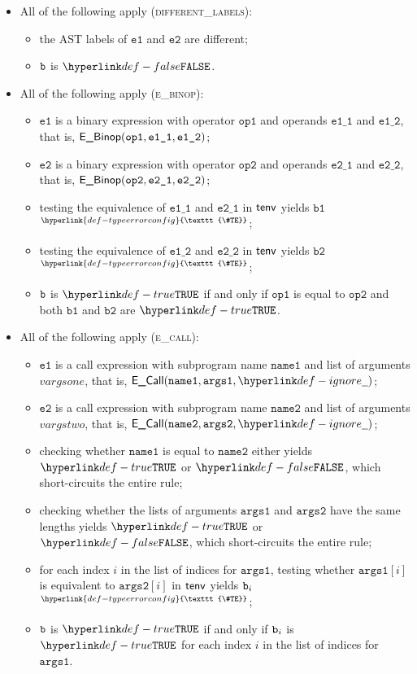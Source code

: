 \documentclass{book}
\newcommand\TypeErrorConfig[0]{\hyperlink{def-typeerrorconfig}{\texttt{\#TE}}}
\newcommand\ProseOrTypeError[0]{\hyperlink{def-proseortypeerror}{$^{\TypeErrorConfig}$}}
\newcommand\veone[0]{\texttt{e1}}
\newcommand\vetwo[0]{\texttt{e2}}
\newcommand\opone[0]{\texttt{op1}}
\newcommand\optwo[0]{\texttt{op2}}
\newcommand\veoneone[0]{\texttt{e1\_1}}
\newcommand\veonetwo[0]{\texttt{e1\_2}}
\newcommand\vetwoone[0]{\texttt{e2\_1}}
\newcommand\vetwotwo[0]{\texttt{e2\_2}}
\newcommand\vbone[0]{\texttt{b1}}
\newcommand\vbtwo[0]{\texttt{b2}}
\newcommand\nameone[0]{\texttt{name1}}
\newcommand\nametwo[0]{\texttt{name2}}
\newcommand\vargsone[0]{\texttt{args1}}
\newcommand\vargstwo[0]{\texttt{args2}}
\begin{document}
\begin{itemize}
  \item All of the following apply (\textsc{different\_labels}):
  \begin{itemize}
    \item the AST labels of $\veone$ and $\vetwo$ are different;
    \item $\texttt{b}$ is $\False$.
  \end{itemize}

  \item All of the following apply (\textsc{e\_binop}):
  \begin{itemize}
    \item $\veone$ is a binary expression with operator $\opone$ and operands $\veoneone$ and $\veonetwo$,
          that is, $\EBinop(\opone, \veoneone, \veonetwo)$;
    \item $\vetwo$ is a binary expression with operator $\optwo$ and operands $\vetwoone$ and $\vetwotwo$,
          that is, $\EBinop(\optwo, \vetwoone, \vetwotwo)$;
    \item testing the equivalence of $\veoneone$ and $\vetwoone$ in $\textsf{tenv}$ yields $\vbone$ \ProseOrTypeError;
    \item testing the equivalence of $\veonetwo$ and $\vetwotwo$ in $\textsf{tenv}$ yields $\vbtwo$ \ProseOrTypeError;
    \item $\texttt{b}$ is $\True$ if and only if $\opone$ is equal to $\optwo$ and both $\vbone$ and $\vbtwo$ are $\True$.
  \end{itemize}

  \item All of the following apply (\textsc{e\_call}):
  \begin{itemize}
    \item $\veone$ is a call expression with subprogram name $\nameone$ and list of arguments $vargsone$,
          that is, $\ECall(\nameone, \vargsone, \Ignore)$;
    \item $\vetwo$ is a call expression with subprogram name $\nametwo$ and list of arguments $vargstwo$,
          that is, $\ECall(\nametwo, \vargstwo, \Ignore)$;
    \item checking whether $\nameone$ is equal to $\nametwo$ either yields $\True$ or $\False$, which short-circuits the entire rule;
    \item checking whether the lists of arguments $\vargsone$ and $\vargstwo$ have the same lengths yields
          $\True$ or $\False$, which short-circuits the entire rule;
    \item for each index $i$ in the list of indices for $\vargsone$, testing whether $\vargsone[i]$ is equivalent to $\vargstwo[i]$
          in $\textsf{tenv}$ yields $\texttt{b}_i$ \ProseOrTypeError;
    \item $\texttt{b}$ is $\True$ if and only if $\texttt{b}_i$ is $\True$ for each index $i$ in the list of indices for $\vargsone$.
  \end{itemize}


\end{itemize}
\end{document}
